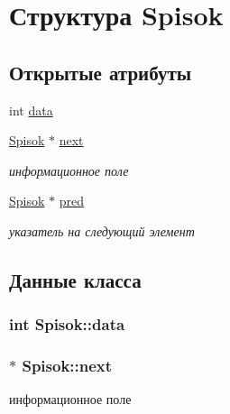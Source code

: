 \hypertarget{struct_spisok}{}\section{Структура Spisok}
\label{struct_spisok}
\subsection*{Открытые атрибуты}
\begin{DoxyCompactItemize}
\item 
int \hyperlink{struct_spisok_af8b77feefa7ad964cdf0f8360e8c88cc}{data}
\item 
\hyperlink{struct_spisok}{Spisok} $\ast$ \hyperlink{struct_spisok_a35b20207a59db363b6ed2efd32e7a05c}{next}
\begin{DoxyCompactList}\small\item\em информационное поле \end{DoxyCompactList}\item 
\hyperlink{struct_spisok}{Spisok} $\ast$ \hyperlink{struct_spisok_a58eec80fc33412d5c29174a83b69e59c}{pred}
\begin{DoxyCompactList}\small\item\em указатель на следующий элемент \end{DoxyCompactList}\end{DoxyCompactItemize}


\subsection{Данные класса}
\hypertarget{struct_spisok_af8b77feefa7ad964cdf0f8360e8c88cc}{}
\subsubsection[{data}]{\setlength{\rightskip}{0pt plus 5cm}int Spisok\+::data}\label{struct_spisok_af8b77feefa7ad964cdf0f8360e8c88cc}
\hypertarget{struct_spisok_a35b20207a59db363b6ed2efd32e7a05c}{}
\subsubsection[{next}]{$\ast$ Spisok\+::next}\label{struct_spisok_a35b20207a59db363b6ed2efd32e7a05c}


информационное поле 

